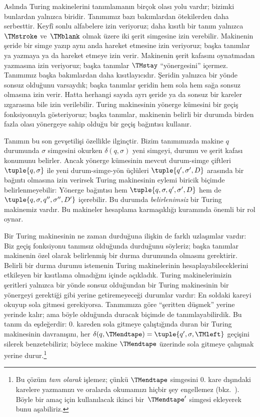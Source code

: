 \documentclass[../../../include/open-logic-section]{subfiles}
\begin{document}

Aslında Turing makinelerini tanımlamanın birçok olası yolu vardır; bizimki
bunlardan yalnızca biridir. Tanımımız bazı bakımlardan ötekilerden daha
serbesttir. Keyfî sonlu alfabelere izin veriyoruz; daha kısıtlı bir tanım
yalnızca $\TMstroke$ ve~$\TMblank$ olmak üzere iki şerit simgesine izin
verebilir. Makinenin şeride bir simge yazıp aynı anda hareket etmesine izin
veriyoruz; başka tanımlar ya yazmaya ya da hareket etmeye izin verir.
Makinenin şerit kafasını oynatmadan yazmasına izin veriyoruz; başka tanımlar
$\TMstay$ ``yönergesini'' içermez. Tanımımız başka bakımlardan daha
kısıtlayıcıdır. Şeridin yalnızca bir yönde sonsuz olduğunu varsaydık; başka
tanımlar şeridin hem sola hem sağa sonsuz olmasına izin verir. Hatta herhangi
sayıda ayrı şeride ya da sonsuz bir kareler ızgarasına bile izin verilebilir.
Turing makinesinin yönerge kümesini bir geçiş fonksiyonuyla gösteriyoruz;
başka tanımlar, makinenin belirli bir durumda birden fazla olası yönergeye
sahip olduğu bir geçiş bağıntısı kullanır.

Tanımın bu son gevşetilişi özellikle ilginçtir. Bizim tanımımızda makine
$q$ durumunda $\sigma$ simgesini okurken $\delta(q,\sigma)$ yeni simgeyi,
durumu ve şerit kafası konumunu belirler. Ancak yönerge kümesinin mevcut
durum-simge çiftleri $\tuple{q,\sigma}$ ile yeni durum-simge-yön üçlüleri
$\tuple{q',\sigma',D}$ arasında bir bağıntı olmasına izin verirsek Turing
makinesinin eylemi biricik biçimde belirlenmeyebilir: Yönerge bağıntısı hem
$\tuple{q,\sigma,q',\sigma',D}$ hem de
$\tuple{q,\sigma,q'',\sigma'',D'}$ içerebilir. Bu durumda
\emph{belirlenimsiz} bir Turing makinemiz vardır. Bu makineler hesaplama
karmaşıklığı kuramında önemli bir rol oynar.

Bir Turing makinesinin ne zaman durduğuna ilişkin de farklı uzlaşımlar vardır:
Biz geçiş fonksiyonu tanımsız olduğunda durduğunu söyleriz; başka tanımlar
makinenin özel olarak belirlenmiş bir durma durumunda olmasını gerektirir.
Belirli bir durma durumu istemenin Turing makinelerinin hesaplayabileceklerini
etkileyen bir kısıtlama olmadığını  içinde açıkladık. Turing
makinelerimizin şeritleri yalnızca bir yönde sonsuz olduğundan bir Turing
makinesinin bir yönergeyi gerektiği gibi yerine getiremeyeceği durumlar vardır:
En soldaki kareyi okuyup sola gitmesi gerekiyorsa. Tanımımıza göre ``şeritten
düşmek'' yerine yerinde kalır; ama böyle olduğunda duracak biçimde de
tanımlayabilirdik. Bu tanım da eşdeğerdir: $0$. kareden sola gitmeye
çalıştığında duran bir Turing makinesinin davranışını, her
$\delta(q,\TMendtape)=\tuple{q',\sigma,\TMleft}$ geçişini silerek
benzetebiliriz; böylece makine $\TMendtape$ üzerinde sola gitmeye çalışmak
yerine durur.\footnote{Bu çözüm \emph{tam olarak} işlemez; çünkü
$\TMendtape$ simgesini $0$. kare dışındaki karelere yazmamızı ve oralarda
okumamızı hiçbir şey engellemez (bkz.~). Böyle bir amaç
için kullanılacak ikinci bir~$\TMendtape'$ simgesi ekleyerek bunu aşabiliriz.}
\end{document}
